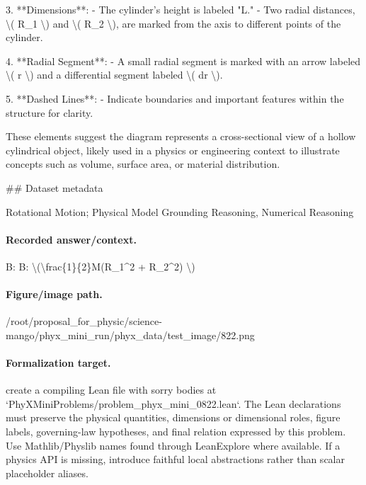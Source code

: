 3. **Dimensions**:
   - The cylinder's height is labeled "L."
   - Two radial distances, \textbackslash{}( R\_1 \textbackslash{}) and \textbackslash{}( R\_2 \textbackslash{}), are marked from the axis to different points of the cylinder.

4. **Radial Segment**:
   - A small radial segment is marked with an arrow labeled \textbackslash{}( r \textbackslash{}) and a differential segment labeled \textbackslash{}( dr \textbackslash{}).

5. **Dashed Lines**:
   - Indicate boundaries and important features within the structure for clarity.

These elements suggest the diagram represents a cross-sectional view of a hollow cylindrical object, likely used in a physics or engineering context to illustrate concepts such as volume, surface area, or material distribution.

\#\# Dataset metadata

Rotational Motion; Physical Model Grounding Reasoning, Numerical Reasoning

\paragraph{Recorded answer/context.}
B: B: \textbackslash{}(\textbackslash{}frac\{1\}\{2\}M(R\_1\textasciicircum{}2 + R\_2\textasciicircum{}2) \textbackslash{})

\paragraph{Figure/image path.}
/root/proposal\_for\_physic/science-mango/phyx\_mini\_run/phyx\_data/test\_image/822.png

\paragraph{Formalization target.}
create a compiling Lean file with sorry bodies at `PhyXMiniProblems/problem\_phyx\_mini\_0822.lean`. The Lean declarations must preserve the physical quantities, dimensions or dimensional roles, figure labels, governing-law hypotheses, and final relation expressed by this problem.
Use Mathlib/Physlib names found through LeanExplore where available. If a physics API is missing, introduce faithful local abstractions rather than scalar placeholder aliases.

